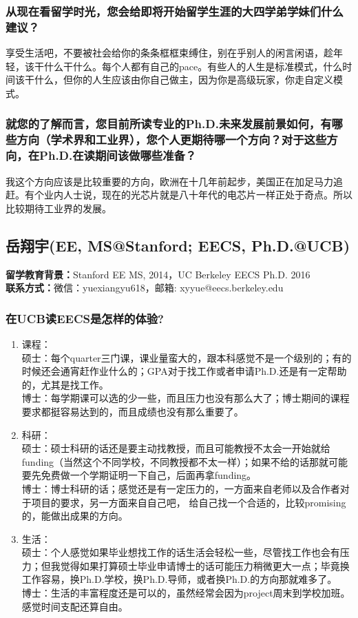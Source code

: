 \documentclass[a4paper,UTF8]{book}
\begin{document}
    \subsubsection*{从现在看留学时光，您会给即将开始留学生涯的大四学弟学妹们什么建议？}
    享受生活吧，不要被社会给你的条条框框束缚住，别在乎别人的闲言闲语，趁年轻，该干什么干什么。每个人都有自己的pace。有些人的人生是标准模式，什么时间该干什么，但你的人生应该由你自己做主，因为你是高级玩家，你走自定义模式。
    
    \subsubsection*{就您的了解而言，您目前所读专业的Ph.D.未来发展前景如何，有哪些方向（学术界和工业界），您个人更期待哪一个方向？对于这些方向，在Ph.D.在读期间该做哪些准备？}
    我这个方向应该是比较重要的方向，欧洲在十几年前起步，美国正在加足马力追赶。有个业内人士说，现在的光芯片就是八十年代的电芯片一样正处于奇点。所以比较期待工业界的发展。


\clearpage
\subsection{岳翔宇(EE, MS@Stanford; EECS, Ph.D.@UCB)}
    \textbf{留学教育背景：}Stanford EE MS, 2014，UC Berkeley EECS Ph.D. 2016\\
    \textbf{联系方式：}微信：yuexiangyu618，邮箱: xyyue@eecs.berkeley.edu

    \subsubsection*{在UCB读EECS是怎样的体验?}
        \begin{enumerate}[itemindent=0pt,itemsep=0pt,parsep=0pt]
            \item 课程：\\
            硕士：每个quarter三门课，课业量蛮大的，跟本科感觉不是一个级别的；有的时候还会通宵赶作业什么的；GPA对于找工作或者申请Ph.D.还是有一定帮助的，尤其是找工作。\\
            博士：每学期课可以选的少一些，而且压力也没有那么大了；博士期间的课程要求都挺容易达到的，而且成绩也没有那么重要了。
            \item 科研：\\
                硕士：硕士科研的话还是要主动找教授，而且可能教授不太会一开始就给funding（当然这个不同学校，不同教授都不太一样）；如果不给的话那就可能要先免费做一个学期证明一下自己，后面再拿funding。\\
                博士：博士科研的话；感觉还是有一定压力的，一方面来自老师以及合作者对于项目的要求，另一方面来自自己吧， 给自己找一个合适的，比较promising的，能做出成果的方向。
            \item 生活：\\
                硕士：个人感觉如果毕业想找工作的话生活会轻松一些，尽管找工作也会有压力；但我觉得如果打算硕士毕业申请博士的话可能压力稍微更大一点；毕竟换工作容易，换Ph.D.学校，换Ph.D.导师，或者换Ph.D.的方向那就难多了。\\
                博士：生活的丰富程度还是可以的，虽然经常会因为project周末到学校加班。感觉时间支配还算自由。
        \end{enumerate}
\end{document}
